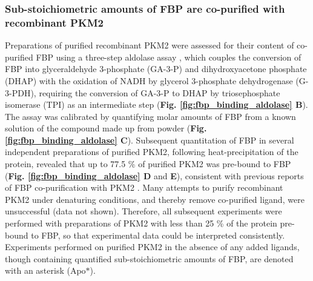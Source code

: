 \subsubsection{Sub-stoichiometric amounts of FBP are co-purified with recombinant PKM2}
Preparations of purified recombinant PKM2 were assessed for their content of co-purified FBP using a three-step aldolase assay \cite{bergmeyer1985methods}, which couples the conversion of FBP into glyceraldehyde 3-phosphate (GA-3-P) and dihydroxyacetone phosphate (DHAP) with the oxidation of NADH by glycerol 3-phosphate dehydrogenase (G-3-PDH), requiring the conversion of GA-3-P to DHAP by triosephosphate isomerase (TPI) as an intermediate step (\textbf{Fig. \ref{fig:fbp_binding_aldolase} B}). The assay was calibrated by quantifying molar amounts of FBP from a known solution of the compound made up from powder (\textbf{Fig. \ref{fig:fbp_binding_aldolase} C}). Subsequent quantitation of FBP in several independent preparations of purified PKM2, following heat-precipitation of the protein, revealed that up to 77.5 \% of purified PKM2 was pre-bound to FBP (\textbf{Fig. \ref{fig:fbp_binding_aldolase} D} and \textbf{E}), consistent with previous reports of FBP co-purification with PKM2 \cite{Gavriilidou:2018aa,Christofk:2008aa}. Many attempts to purify recombinant PKM2 under denaturing conditions, and thereby remove co-purified ligand, were unsuccessful (data not shown). Therefore, all subsequent experiments were performed with preparations of PKM2 with less than 25 \% of the protein pre-bound to FBP, so that experimental data could be interpreted consistently. Experiments performed on purified PKM2 in the absence of any added ligands, though containing quantified sub-stoichiometric amounts of FBP, are denoted with an asterisk (Apo$\ast$).

